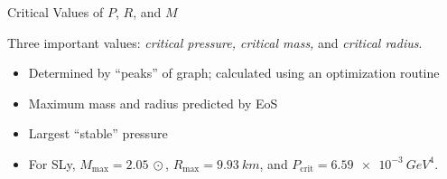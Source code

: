 \documentclass[handout]{beamer}
\begin{document}
\begin{frame}{Critical Values of $P$, $R$, and $M$}
\begin{figure}[h!]
\begin{subfigure}{.5\textwidth}
            \end{subfigure}
        \end{figure} \pause
        Three important values: \pause \textit{critical pressure, critical mass,} and \textit{critical radius}. \pause 
        \begin{itemize}
            \item Determined by ``peaks'' of graph\pause ; calculated using an optimization routine \pause
            \item Maximum mass and radius predicted by EoS \pause
            \item Largest ``stable'' pressure \pause
            \item For SLy, $M_\text{max} = \SI{2.05}{\odot}$, $R_\text{max} = \SI{9.93}{km}$, and $P_\text{crit} = \SI{6.59e-3}{GeV^4}$.
        \end{itemize}

    \end{frame}
\end{document}
